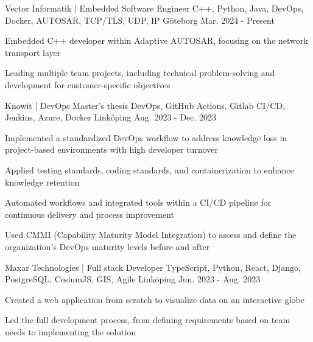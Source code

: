 

\begin{cventries}

  \cventry
    {Vector Informatik | Embedded Software Engineer} %
    {C++, Python, Java, DevOps, Docker, AUTOSAR, TCP/TLS, UDP, IP} %
    {Göteborg} %
    {Mar. 2024 - Present} %
    {
      \begin{cvitems} %
        \item {Embedded C++ developer within Adaptive AUTOSAR, focusing on the network transport layer}
        \item {Leading multiple team projects, including technical problem-solving and development for customer-specific objectives}
      \end{cvitems}
    }

   \cventry
    {Knowit | DevOps Master's thesis} %
    {DevOps, GitHub Actions, Gitlab CI/CD, Jenkins, Azure, Docker} %
    {Linköping} %
    {Aug. 2023 - Dec. 2023} %
    {
      \begin{cvitems} %
        \item {Implemented a standardized DevOps workflow to address knowledge loss in project-based environments with high developer turnover}
        \item {Applied testing standards, coding standards, and containerization to enhance knowledge retention}
        \item {Automated workflows and integrated tools within a CI/CD pipeline for continuous delivery and process improvement}
        \item {Used CMMI (Capability Maturity Model Integration) to assess and define the organization’s DevOps maturity levels before and after}
      \end{cvitems}
    }

  \cventry
    {Maxar Technologies | Full stack Developer} %
    {TypeScript, Python, React, Django, PostgreSQL, CesiumJS, GIS, Agile} %
    {Linköping} %
    {Jun. 2023 - Aug. 2023} %
    {
      \begin{cvitems} %
        \item {Created a web application from scratch to visualize data on an interactive globe}
        \item {Led the full development process, from defining requirements based on team needs to implementing the solution}
      \end{cvitems}
    }

\end{cventries}